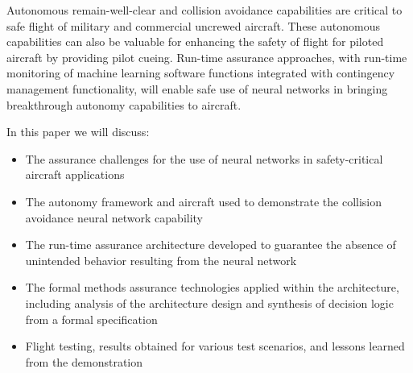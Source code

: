 Autonomous remain-well-clear and collision avoidance capabilities are critical to safe flight of
military and commercial uncrewed aircraft. These autonomous capabilities can also be valuable for
enhancing the safety of flight for piloted aircraft by providing pilot cueing. Run-time assurance
approaches, with run-time monitoring of machine learning software functions integrated with
contingency management functionality, will enable safe use of neural networks in bringing
breakthrough autonomy capabilities to aircraft.

In this paper we will discuss: 
\begin{itemize} 
\item The assurance challenges for the use of neural networks in safety-critical aircraft applications 
\item The autonomy framework and aircraft used to demonstrate the collision avoidance neural network capability 
\item The run-time assurance architecture developed to guarantee the absence of unintended behavior resulting from the neural network 
\item The formal methods assurance technologies applied within the architecture, including analysis of the architecture design and synthesis of decision logic from a formal specification
\item Flight testing, results obtained for various test scenarios, and lessons learned from the
demonstration
\end{itemize}
